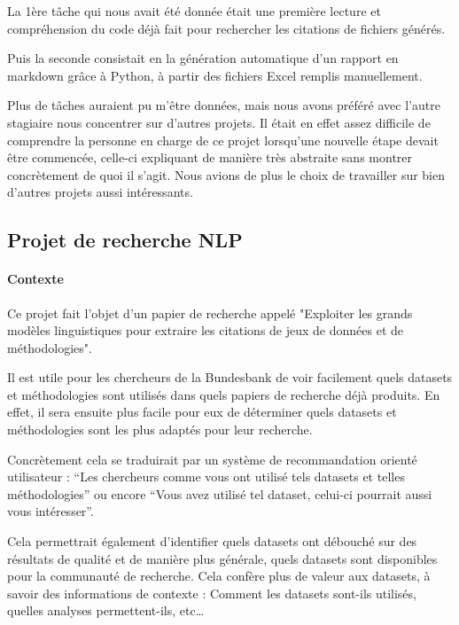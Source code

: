 La 1ère tâche qui nous avait été donnée était une première lecture et compréhension du code déjà fait pour rechercher les citations de fichiers générés.

Puis la seconde consistait en la génération automatique d'un rapport en markdown grâce à Python, à partir des fichiers Excel remplis manuellement.

Plus de tâches auraient pu m'être données, mais nous avons préféré avec l'autre stagiaire nous concentrer sur d'autres projets. 
Il était en effet assez difficile de comprendre la personne en charge de ce projet lorsqu'une nouvelle étape devait être commencée, celle-ci expliquant de manière très abstraite sans montrer concrètement de quoi il s'agit.
Nous avions de plus le choix de travailler sur bien d'autres projets aussi intéressants.

\pagebreak

\subsection{Projet de recherche NLP}

\paragraph{Contexte}

Ce projet fait l'objet d'un papier de recherche appelé "Exploiter les grands modèles linguistiques pour extraire les citations de jeux de données et de méthodologies".

Il est utile pour les chercheurs de la Bundesbank de voir facilement quels datasets et méthodologies sont utilisés dans quels papiers de recherche déjà produits. 
En effet, il sera ensuite plus facile pour eux de déterminer quels datasets et méthodologies sont les plus adaptés pour leur recherche. 

Concrètement cela se traduirait par un système de recommandation orienté utilisateur : “Les chercheurs comme vous ont utilisé tels datasets et telles méthodologies” ou encore “Vous avez utilisé tel dataset, celui-ci pourrait aussi vous intéresser”. 

Cela permettrait également d'identifier quels datasets ont débouché sur des résultats de qualité et de manière plus générale, quels datasets sont disponibles pour la communauté de recherche.
Cela confère plus de valeur aux datasets, à savoir des informations de contexte : Comment les datasets sont-ils utilisés, quelles analyses permettent-ils, etc… 

